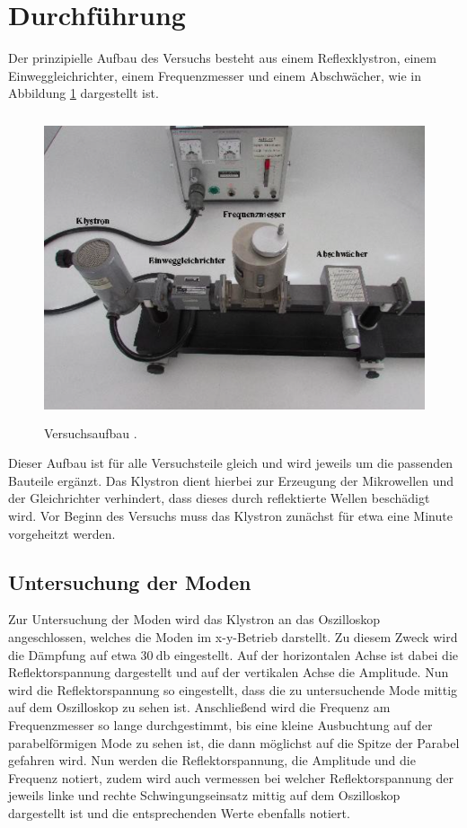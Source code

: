 \section{Durchführung}
\label{sec:Durchführung}
Der prinzipielle Aufbau des Versuchs besteht aus einem Reflexklystron, einem
Einweggleichrichter, einem Frequenzmesser und einem Abschwächer, wie in Abbildung
\ref{fig:aufbau} dargestellt ist.
\begin{figure}[H]
  \centering
  \includegraphics[height=9cm]{aufbau.png}
  \caption{Versuchsaufbau \cite{Skript}.}
  \label{fig:aufbau}
\end{figure}
Dieser Aufbau ist für alle Versuchsteile gleich und wird jeweils um die passenden
Bauteile ergänzt. Das Klystron dient hierbei zur Erzeugung der Mikrowellen und der
Gleichrichter verhindert, dass dieses durch reflektierte Wellen beschädigt wird.
Vor Beginn des Versuchs muss das Klystron zunächst für etwa eine Minute vorgeheitzt
werden.

\subsection{Untersuchung der Moden}
Zur Untersuchung der Moden wird das Klystron an das Oszilloskop angeschlossen, welches
die Moden im x-y-Betrieb darstellt. Zu diesem Zweck wird die Dämpfung auf etwa
$\SI{30}{\decibel}$ eingestellt. Auf der horizontalen Achse ist dabei die Reflektorspannung
dargestellt und auf der vertikalen Achse die Amplitude. Nun wird die Reflektorspannung
so eingestellt, dass die zu untersuchende Mode mittig auf dem Oszilloskop zu sehen ist.
Anschließend wird die Frequenz am Frequenzmesser so lange durchgestimmt, bis eine kleine
Ausbuchtung auf der parabelförmigen Mode zu sehen ist, die dann möglichst auf die
Spitze der Parabel gefahren wird. Nun werden die Reflektorspannung, die Amplitude und
die Frequenz notiert, zudem wird auch vermessen bei welcher Reflektorspannung der jeweils
linke und rechte Schwingungseinsatz mittig auf dem Oszilloskop dargestellt ist und die
entsprechenden Werte ebenfalls notiert. \\

